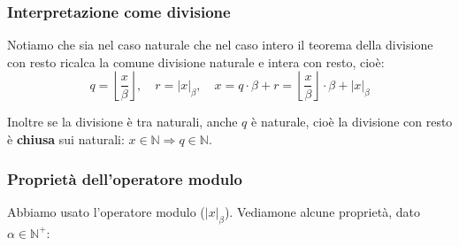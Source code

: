 \documentclass[a4paper,11pt]{article}
\begin{document}
\subsubsection{Interpretazione come divisione}
Notiamo che sia nel caso naturale che nel caso intero il teorema della divisione con resto ricalca la comune divisione naturale e intera con resto, cioè:
$$
q = \left\lfloor \frac{x}{\beta} \right\rfloor, \quad r = |x|_\beta, \quad x = q \cdot \beta + r = \left\lfloor \frac{x}{\beta} \right\rfloor \cdot \beta + |x|_\beta
$$

Inoltre se la divisione è tra naturali, anche $q$ è naturale, cioè la divisione con resto è \textbf{chiusa} sui naturali: $x \in \mathbb{N} \Rightarrow q \in \mathbb{N}$.

\subsubsection{Proprietà dell'operatore modulo}
Abbiamo usato l'operatore modulo ($|x|_\beta$). Vediamone alcune proprietà, dato $\alpha \in \mathbb{N}^+$:
\end{document}
